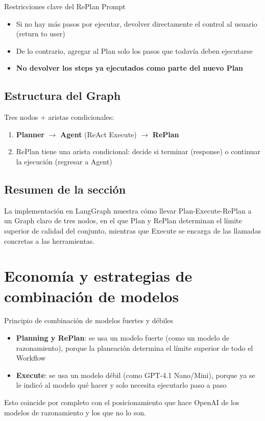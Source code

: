 \documentclass[a4paper]{article}
\begin{document}
\begin{warningbox}{Restricciones clave del RePlan Prompt}
\begin{itemize}
    \item Si no hay más pasos por ejecutar, devolver directamente el control al usuario (return to user)
    \item De lo contrario, agregar al Plan solo los pasos que todavía deben ejecutarse
    \item \textbf{No devolver los steps ya ejecutados como parte del nuevo Plan}
\end{itemize}
\end{warningbox}

\subsection{Estructura del Graph}

Tres nodos + aristas condicionales:
\begin{enumerate}
    \item \textbf{Planner} $\rightarrow$ \textbf{Agent} (ReAct Execute) $\rightarrow$ \textbf{RePlan}
    \item RePlan tiene una arista condicional: decide si terminar (response) o continuar la ejecución (regresar a Agent)
\end{enumerate}

\subsection{Resumen de la sección}

La implementación en LangGraph muestra cómo llevar Plan-Execute-RePlan a un Graph claro de tres nodos, en el que Plan y RePlan determinan el límite superior de calidad del conjunto, mientras que Execute se encarga de las llamadas concretas a las herramientas.

\section{Economía y estrategias de combinación de modelos}

\begin{importantbox}{Principio de combinación de modelos fuertes y débiles}
\begin{itemize}
    \item \textbf{Planning y RePlan}: se usa un modelo fuerte (como un modelo de razonamiento), porque la planeación determina el límite superior de todo el Workflow
    \item \textbf{Execute}: se usa un modelo débil (como GPT-4.1 Nano/Mini), porque ya se le indicó al modelo qué hacer y solo necesita ejecutarlo paso a paso
\end{itemize}
Esto coincide por completo con el posicionamiento que hace OpenAI de los modelos de razonamiento y los que no lo son.
\end{importantbox}
\end{document}
